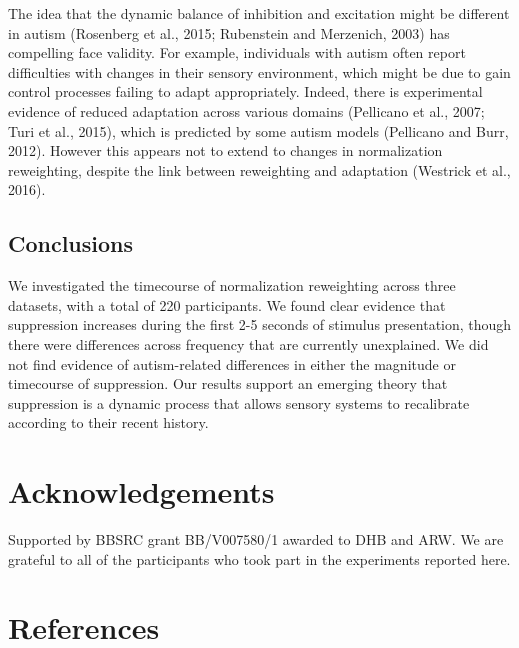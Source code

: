 \documentclass[
]{article}
\begin{document}
The idea that the dynamic balance of inhibition and excitation might be different in autism (Rosenberg et al., 2015; Rubenstein and Merzenich, 2003) has compelling face validity. For example, individuals with autism often report difficulties with changes in their sensory environment, which might be due to gain control processes failing to adapt appropriately. Indeed, there is experimental evidence of reduced adaptation across various domains (Pellicano et al., 2007; Turi et al., 2015), which is predicted by some autism models (Pellicano and Burr, 2012). However this appears not to extend to changes in normalization reweighting, despite the link between reweighting and adaptation (Westrick et al., 2016).

\hypertarget{conclusions}{%
\subsection{Conclusions}\label{conclusions}}

We investigated the timecourse of normalization reweighting across three datasets, with a total of 220 participants. We found clear evidence that suppression increases during the first 2-5 seconds of stimulus presentation, though there were differences across frequency that are currently unexplained. We did not find evidence of autism-related differences in either the magnitude or timecourse of suppression. Our results support an emerging theory that suppression is a dynamic process that allows sensory systems to recalibrate according to their recent history.

\hypertarget{acknowledgements}{%
\section{Acknowledgements}\label{acknowledgements}}

Supported by BBSRC grant BB/V007580/1 awarded to DHB and ARW. We are grateful to all of the participants who took part in the experiments reported here.

\hypertarget{references}{%
\section*{References}\label{references}}
\end{document}
